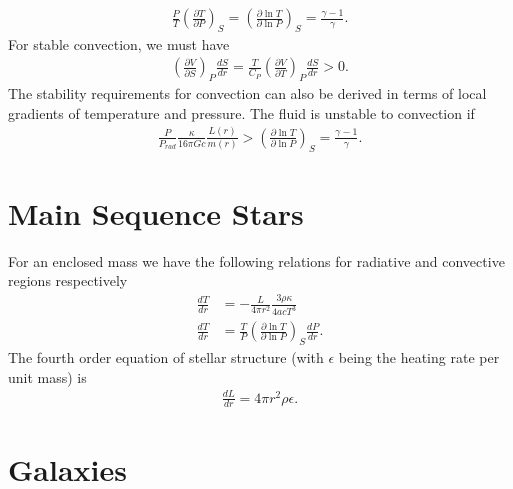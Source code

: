\begin{multicols}{2}
\begin{align}
\frac{P}{T}\left(\frac{\partial T}{\partial P}\right)_S = \left(\frac{\partial \ln T}{\partial \ln P}\right)_S = \frac{\gamma -1}{\gamma}.
\end{align}
For stable convection, we must have
\begin{align}
\left(\frac{\partial V}{\partial S}\right)_P\frac{dS}{dr} = \frac{T}{C_P}\left(\frac{\partial V}{\partial T}\right)_P\frac{dS}{dr} > 0.
\end{align}
The stability requirements for convection can also be derived in terms of local gradients of temperature and pressure. The fluid is unstable to convection if
\begin{align}
\frac{P}{P_{rad}}\frac{\kappa}{16\pi Gc}\frac{L(r)}{m(r)} > \left(\frac{\partial \ln T}{\partial \ln P}\right)_S = \frac{\gamma-1}{\gamma}.
\end{align}
\section{Main Sequence Stars}
For an enclosed mass we have the following relations for radiative and convective regions respectively
\begin{align}
	\frac{dT}{dr} &= -\frac{L}{4\pi r^2}\frac{3\rho \kappa}{4acT^3} \\
	\frac{dT}{dr} &= \frac{T}{P}\left(\frac{\partial \ln T}{\partial \ln P}\right)_S \frac{dP}{dr}.
\end{align}
The fourth order equation of stellar structure  (with $\epsilon$ being the heating rate per unit mass) is
\begin{align}
	\frac{dL}{dr} = 4\pi r^2\rho \epsilon.
\end{align}
\end{multicols}

\newpage

\section{Galaxies}

